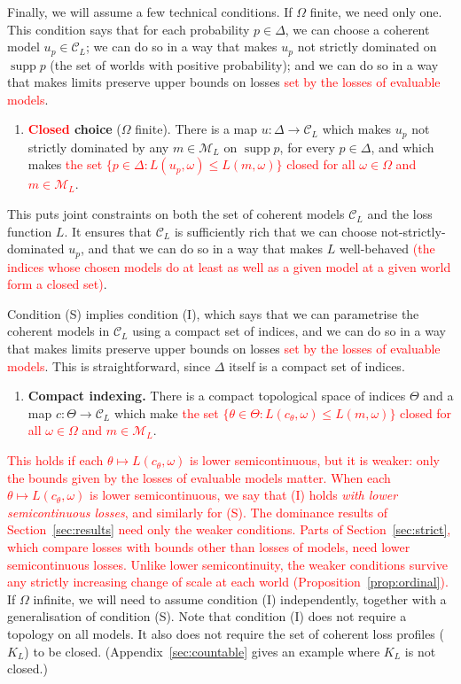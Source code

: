 \documentclass[11pt]{article}
\theoremstyle{definition}
\theoremstyle{remark}
\newcommand{\M}{\mathcal M}
\newcommand{\C}{\mathcal C}
\newcommand{\supp}{\operatorname{supp}}
\begin{document}
Finally, we will assume a few technical conditions. If $\Omega$ finite, we need only one. This condition says that for each probability $p\in\Delta$, we can choose a coherent model $u_p\in\C_L$; we can do so in a way that makes $u_p$ not strictly dominated on $\supp p$ (the set of worlds with positive probability); and we can do so in a way that makes limits preserve upper bounds on losses\textcolor{red}{ set by the losses of evaluable models}.
\begin{enumerate}[label=\textbf{(S)},leftmargin=*]
\item \textbf{\textcolor{red}{Closed} choice} ($\Omega$ finite). There is a map $u:\Delta\to\C_L$ which makes $u_p$ not strictly dominated by any $m\in\M_L$ on $\supp p$, for every $p\in\Delta$, and which makes \textcolor{red}{the set $\{p\in\Delta:L(u_p,\omega)\le L(m,\omega)\}$ closed for all $\omega\in\Omega$ and $m\in\M_L$}.
\end{enumerate}
This puts joint constraints on both the set of coherent models $\C_L$ and the loss function $L$. It ensures that $\C_L$ is sufficiently rich that we can choose not-strictly-dominated $u_p$, and that we can do so in a way that makes $L$ well-behaved \textcolor{red}{(the indices whose chosen models do at least as well as a given model at a given world form a closed set)}.


Condition (S) implies condition (I), which says that we can parametrise the coherent models in $\C_L$ using a compact set of indices, and we can do so in a way that makes limits preserve upper bounds on losses\textcolor{red}{ set by the losses of evaluable models}. This is straightforward, since $\Delta$ itself is a compact set of indices.
\begin{enumerate}[label=\textbf{(I)},leftmargin=*]
\item \textbf{Compact indexing.} There is a compact topological space of indices $\Theta$ and a map $c:\Theta\to\C_L$ which make \textcolor{red}{the set $\{\theta\in\Theta:L(c_\theta,\omega)\le L(m,\omega)\}$ closed for all $\omega\in\Omega$ and $m\in\M_L$}.
\end{enumerate}
\textcolor{red}{This holds if each $\theta\mapsto L(c_\theta,\omega)$ is lower semicontinuous, but it is weaker: only the bounds given by the losses of evaluable models matter. When each $\theta\mapsto L(c_\theta,\omega)$ is lower semicontinuous, we say that (I) holds \emph{with lower semicontinuous losses}, and similarly for (S). The dominance results of Section~\ref{sec:results} need only the weaker conditions. Parts of Section~\ref{sec:strict}, which compare losses with bounds other than losses of models, need lower semicontinuous losses. Unlike lower semicontinuity, the weaker conditions survive any strictly increasing change of scale at each world (Proposition~\ref{prop:ordinal}).}
If $\Omega$ infinite, we will need to assume condition (I) independently, together with a generalisation of condition (S). Note that condition (I) does not require a topology on all models. It also does not require the set of coherent loss profiles ($K_L$) to be closed. (Appendix~\ref{sec:countable} gives an example where $K_L$ is not closed.) 
\end{document}
